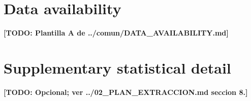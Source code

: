 \documentclass[apj]{openjournal}
\newcommand{\todo}[1]{\textbf{[TODO: #1]}}
\begin{document}
\section*{Data availability}
\todo{Plantilla A de ../comun/DATA\_AVAILABILITY.md}




\appendix
\section{Supplementary statistical detail}
\todo{Opcional; ver ../02\_PLAN\_EXTRACCION.md seccion 8.}
\end{document}
